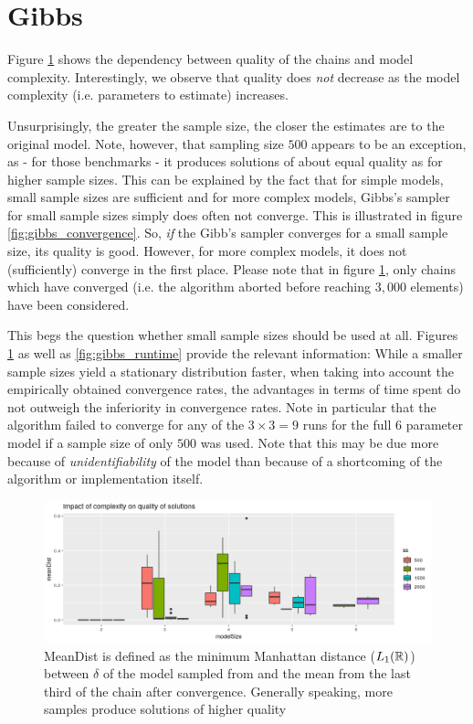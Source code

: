 

\section{Gibbs}
\label{chap:gibbs}

Figure \ref{fig:gibbs_quality} shows the dependency between quality of the chains and model complexity.  Interestingly, we observe that quality does \textit{not} decrease as the model complexity (i.e. parameters to estimate) increases. 

Unsurprisingly, the greater the sample size, the closer the estimates are to the original model. Note, however, that sampling size $500$ appears to be an exception, as - for those benchmarks - it produces solutions of about equal quality as for higher sample sizes. This can be explained by the fact that for simple models, small sample sizes are sufficient and for more complex models, Gibbs's sampler for small sample sizes simply does often not converge. This is illustrated in figure \ref{fig:gibbs_convergence}. So, \textit{if} the Gibb's sampler converges for a small sample size, its quality is good. However, for more complex models, it does not (sufficiently) converge in the first place. 
Please note that in figure \ref{fig:gibbs_quality}, only chains which have converged (i.e. the algorithm aborted before reaching $3,000$ elements) have been considered. 

This begs the question whether small sample sizes should be used at all. Figures \ref{fig:gibbs_quality} as well as \ref{fig:gibbs_runtime} provide the relevant information: While a smaller sample sizes yield a stationary distribution faster, when taking into account the empirically obtained  convergence rates, the advantages in terms of time spent do not outweigh the inferiority in convergence rates. Note in particular that the algorithm failed to converge for any of the $3\times3 =9$ runs for the full $6$ parameter model if a sample size of only $500$ was used. Note that this may be due more because of \textit{unidentifiability} of the model than because of a shortcoming of the algorithm or implementation itself. 

\begin{figure}
	\includegraphics[width=\linewidth]{img/sim_bern_gibbs_quality.png}
	\caption{MeanDist is defined as the minimum Manhattan distance ($L_1(\mathbb{R})$) between $\delta$ of the model sampled from and the mean from the last third of the chain after convergence. Generally speaking, more samples produce solutions of higher quality }
	\label{fig:gibbs_quality}
\end{figure}


